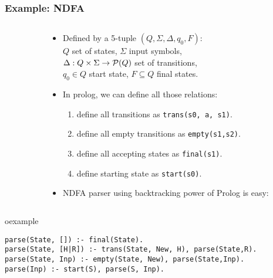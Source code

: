 \begin{frame}[fragile]
\frametitle{Example: NDFA}
\begin{columns}
\begin{column}{.25\textwidth}
\tiny
{}
\end{column}
\begin{column}{.75\textwidth}
\small
\begin{itemize}
\item Defined by a 5-tuple $(Q, \Sigma, \Delta , q_0, F)$:\\
$Q$ set of states, $\Sigma$ input symbols,\\
 $\Delta: Q \times \Sigma \rightarrow {\cal P}(Q)$
set of transitions,\\
$q_0 \in Q$ start state, $F \subseteq Q$ final states.
\item In prolog, we can define all those relations:\\
    \begin{enumerate}\scriptsize
    \item define all transitions as \lstinline!trans(s0, a, s1)!.
    \item define all empty transitions as \lstinline!empty(s1,s2)!.
    \item define all accepting states as \lstinline!final(s1)!.
    \item define starting state as \lstinline!start(s0)!.
    \end{enumerate}
\item NDFA parser using backtracking power of Prolog is easy:
\end{itemize}
\end{column}
\end{columns}
\begin{beamercolorbox}{oexample}
\begin{lstlisting}[basicstyle=\scriptsize\ttfamily]
parse(State, []) :- final(State).
parse(State, [H|R]) :- trans(State, New, H), parse(State,R).
parse(State, Inp) :- empty(State, New), parse(State,Inp).
parse(Inp) :- start(S), parse(S, Inp).
\end{lstlisting}
\end{beamercolorbox}
\end{frame}

